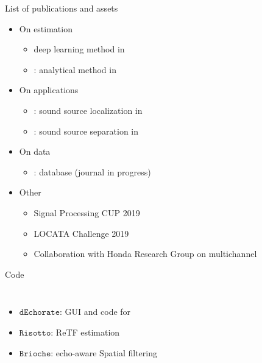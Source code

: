 \begin{frame}{List of publications and assets}
    \begin{itemize}
        \item On estimation
        \begin{itemize}\small
            \item deep learning method in~\cite{di2019mirage}
            \item \blaster: analytical method in~\cite{di2020blaster}
        \end{itemize}
        \item On applications
        \begin{itemize}\small
            \item \mirage: sound source localization in~\cite{di2019mirage}
            \item \separake: sound source separation in~\cite{scheibler2018separake}
        \end{itemize}
        \item On data
        \begin{itemize}\small
            \item \dechorate: database (journal in progress)
        \end{itemize}
        \item Other
        \begin{itemize}\small
            \item Signal Processing CUP 2019 \cite{deleforge2019audio}
            \item LOCATA Challenge 2019 \cite{lebarbenchon2018evaluation}
            \item Collaboration with Honda Research Group on multichannel \mirage
        \end{itemize}
    \end{itemize}

    \vspace{-2mm}
    \begin{block}{Code}
        \begin{columns}[T,onlytextwidth]
            \begin{itemize}\small
                \item $\mathtt{dEchorate}$: GUI and code for \dechorate
                \item $\mathtt{Risotto}$: ReTF estimation
                \item $\mathtt{Brioche}$: echo-aware Spatial filtering
            \end{itemize}


\end{columns}
\end{block}
\end{frame}
